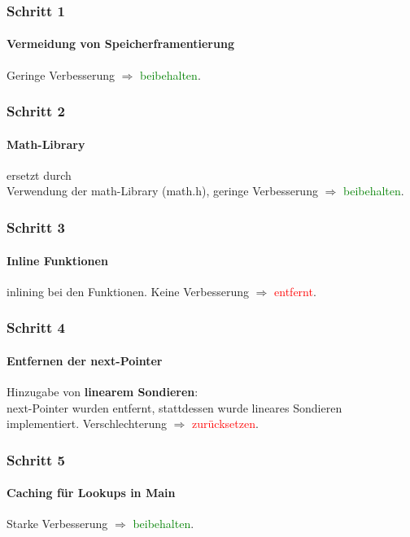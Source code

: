 \documentclass{beamer}
\newcommand{\success}[1]{\textcolor{green}{#1}}
\newcommand{\fail}[1]{\textcolor{red}{#1}}
\begin{document}
  \begin{frame}
    \frametitle{Schritt 1}
    \framesubtitle{Vermeidung von Speicherframentierung}
		\sOne
		Geringe Verbesserung $\Rightarrow$ \success{beibehalten}.
  \end{frame}  
  
  \begin{frame}
  	\frametitle{Schritt 2}
  	\framesubtitle{Math-Library}
  	\sTwoOne
  	ersetzt durch\\[1em]
  	\sTwoTwo
  	Verwendung der math-Library (math.h), geringe Verbesserung $\Rightarrow$ \success{beibehalten}.
  \end{frame}	
  
  \begin{frame}
  	\frametitle{Schritt 3}
  	\framesubtitle{Inline Funktionen}
  	\sThree
  	inlining bei den Funktionen.
  	Keine Verbesserung $\Rightarrow$ \fail{entfernt}.
  \end{frame}
  
  \begin{frame}
  	\frametitle{Schritt 4}
  	\framesubtitle{Entfernen der next-Pointer}
  	\sFourOne
  	Hinzugabe von \textbf{linearem Sondieren}:\\[1em]
  	\sFourTwo
  	next-Pointer wurden entfernt, stattdessen wurde lineares Sondieren implementiert.
  	Verschlechterung $\Rightarrow$ \fail{zur\"ucksetzen}.  
  \end{frame}
  
  \begin{frame}
  	\frametitle{Schritt 5}
  	\framesubtitle{Caching f\"ur Lookups in Main}
  	\sFive
  	
  	Starke Verbesserung $\Rightarrow$ \success{beibehalten}.
  \end{frame}
  
\end{document}
